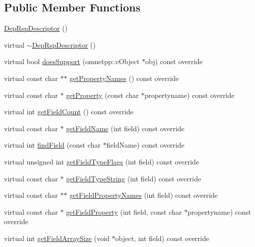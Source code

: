 \subsection*{Public Member Functions}
\begin{DoxyCompactItemize}
\item 
\hyperlink{class_dep_rsp_descriptor_ad256a6a63460351ea6a372618915c2d8}{Dep\+Rsp\+Descriptor} ()
\item 
virtual \hyperlink{class_dep_rsp_descriptor_abc19e536e455faeb3fd8670b5447a083}{$\sim$\+Dep\+Rsp\+Descriptor} ()
\item 
virtual bool \hyperlink{class_dep_rsp_descriptor_a7a880007ffa97b1e7506e5006dff76fc}{does\+Support} (omnetpp\+::c\+Object $\ast$obj) const override
\item 
virtual const char $\ast$$\ast$ \hyperlink{class_dep_rsp_descriptor_a9549506315f1c8710721599924afec0d}{get\+Property\+Names} () const override
\item 
virtual const char $\ast$ \hyperlink{class_dep_rsp_descriptor_aafacdcf48c89777dd32b2515d46156a3}{get\+Property} (const char $\ast$propertyname) const override
\item 
virtual int \hyperlink{class_dep_rsp_descriptor_a7704deff767464de71b08e877144aef3}{get\+Field\+Count} () const override
\item 
virtual const char $\ast$ \hyperlink{class_dep_rsp_descriptor_a7ae3b3dbb2acbc29d3e6b9d80dad5f42}{get\+Field\+Name} (int field) const override
\item 
virtual int \hyperlink{class_dep_rsp_descriptor_a585faf6892da7b79d18edde57949fcc6}{find\+Field} (const char $\ast$field\+Name) const override
\item 
virtual unsigned int \hyperlink{class_dep_rsp_descriptor_a1d2e200ee36fc4be43c1babc7b1b4a19}{get\+Field\+Type\+Flags} (int field) const override
\item 
virtual const char $\ast$ \hyperlink{class_dep_rsp_descriptor_a2886a2c8ff88687682793f94abeee31b}{get\+Field\+Type\+String} (int field) const override
\item 
virtual const char $\ast$$\ast$ \hyperlink{class_dep_rsp_descriptor_ae59e1248d631d86bbec3d02c5cd03db8}{get\+Field\+Property\+Names} (int field) const override
\item 
virtual const char $\ast$ \hyperlink{class_dep_rsp_descriptor_a8cf738132398ab2204904ed1388fcd40}{get\+Field\+Property} (int field, const char $\ast$propertyname) const override
\item 
virtual int \hyperlink{class_dep_rsp_descriptor_a559a24842bd0a622463eb3417a31fc5c}{get\+Field\+Array\+Size} (void $\ast$object, int field) const override

\end{DoxyCompactItemize}
